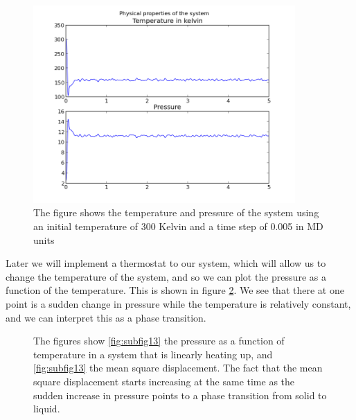 \documentclass[12pt]{article}
\begin{document}
  \begin{figure}
\centering
\includegraphics[width=10cm]{simplephysproperties.png}
\caption{\label{fig:8} The figure shows the temperature and pressure of the system using an initial temperature of 300 Kelvin and a time step of 0.005 in MD units}
\end{figure}

Later we will implement a thermostat to our system, which will allow us to change the temperature of the system, and so we can plot the pressure as a function of the temperature. This is shown in figure \ref{fig:9}. We see that there at one point is a sudden change in pressure while the temperature is relatively constant, and we can interpret this as a phase transition.

\begin{figure}[ht]
\centering
{}
\caption[Optional caption for list of figures]{The figures show \ref{fig:subfig13} the pressure as a function of temperature in a system that is linearly heating up, and \ref{fig:subfig13} the mean square displacement. The fact that the mean square displacement starts increasing at the same time as the sudden increase in pressure points to a phase transition from solid to liquid.}
\label{fig:9}
\end{figure}
\end{document}
